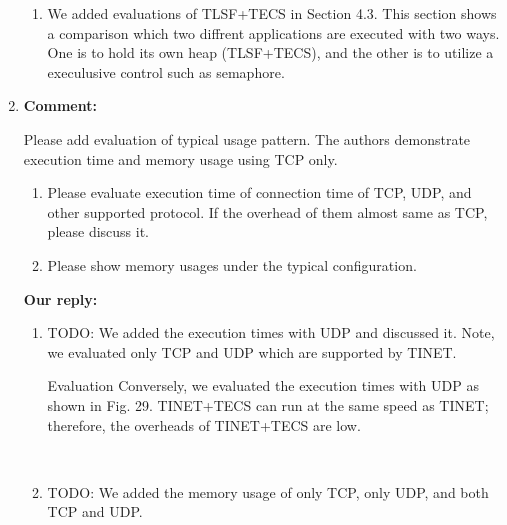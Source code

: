 \documentclass{article}
\begin{document}
\begin{enumerate}
\begin{flushleft}
\begin{enumerate}
\item We added evaluations of TLSF+TECS in Section 4.3.
    This section shows a comparison which two diffrent applications are executed with two ways.
    One is to hold its own heap (TLSF+TECS), and the other is to utilize a execulusive control such as semaphore.

\end{enumerate}
\end{flushleft}

\item \begin{flushleft}
\textbf{Comment:}

Please add evaluation of typical usage pattern. The authors demonstrate execution time and memory usage using TCP only. 

\begin{enumerate}
\item Please evaluate execution time of connection time of TCP, UDP, and other supported protocol. If the overhead of them almost same as TCP, please discuss it. 

\item Please show memory usages under the typical configuration.
\end{enumerate}
\end{flushleft}

\begin{flushleft}
\textbf{Our reply:}

\begin{enumerate}
\item
    TODO: 
    We added the execution times with UDP and discussed it.
    Note, we evaluated only TCP and UDP which are supported by TINET.
\begin{itembox}[|]{Evaluation}
Conversely, we evaluated the execution times with UDP as shown in Fig. 29.
TINET+TECS can run at the same speed as TINET; therefore, the overheads of TINET+TECS are low.
\end{itembox}\\

\item
    TODO:
    We added the memory usage of only TCP, only UDP, and both TCP and UDP.

\end{enumerate}
\end{flushleft}


\end{enumerate}

\clearpage
\end{document}
